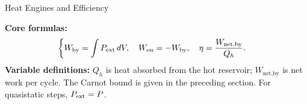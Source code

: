 \begin{KnowledgePoint}{Heat Engines and Efficiency \Core}
  \KPFormulas
  \begin{formulabox}
  \textbf{Core formulas:}
  \[
  \left\{\begin{aligned}
    &W_{\text{by}}=\int P_{\rm ext}\,dV,\quad W_{\text{on}}=-W_{\text{by}},\quad \eta=\frac{W_{\text{net,by}}}{Q_h}.
  \end{aligned}\right.
  \]
  \textbf{Variable definitions:} $Q_h$ is heat absorbed from the hot reservoir; $W_{\text{net,by}}$ is net work per cycle. The Carnot bound is given in the preceding section. For quasistatic steps, $P_{\rm ext}=P$.
  \end{formulabox}
\end{KnowledgePoint}



